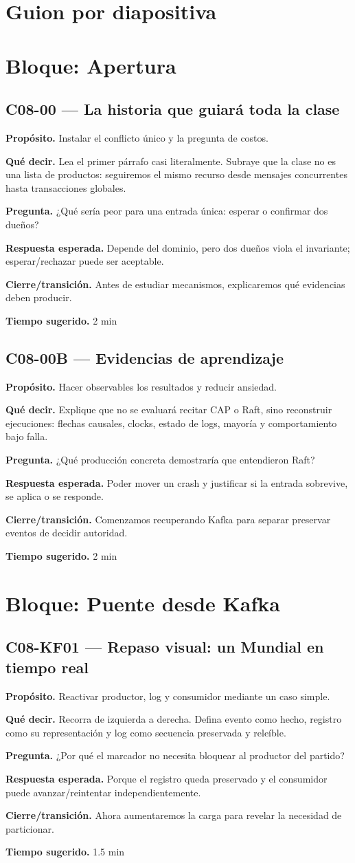 \documentclass[variant=docente,cover=institutional,mode=screen]{ua-engineering-v6-article}
\newcommand{\FrameField}[2]{\par\noindent\textbf{#1.} #2\par}
\begin{document}
\section{Guion por diapositiva}

\section{Bloque: Apertura}

\subsection*{C08-00 --- La historia que guiará toda la clase}
\FrameField{Propósito}{Instalar el conflicto único y la pregunta de costos.}
\FrameField{Qué decir}{Lea el primer párrafo casi literalmente. Subraye que la clase no es una lista de productos: seguiremos el mismo recurso desde mensajes concurrentes hasta transacciones globales.}
\FrameField{Pregunta}{¿Qué sería peor para una entrada única: esperar o confirmar dos dueños?}
\FrameField{Respuesta esperada}{Depende del dominio, pero dos dueños viola el invariante; esperar/rechazar puede ser aceptable.}
\FrameField{Cierre/transición}{Antes de estudiar mecanismos, explicaremos qué evidencias deben producir.}
\FrameField{Tiempo sugerido}{2 min}

\subsection*{C08-00B --- Evidencias de aprendizaje}
\FrameField{Propósito}{Hacer observables los resultados y reducir ansiedad.}
\FrameField{Qué decir}{Explique que no se evaluará recitar CAP o Raft, sino reconstruir ejecuciones: flechas causales, clocks, estado de logs, mayoría y comportamiento bajo falla.}
\FrameField{Pregunta}{¿Qué producción concreta demostraría que entendieron Raft?}
\FrameField{Respuesta esperada}{Poder mover un crash y justificar si la entrada sobrevive, se aplica o se responde.}
\FrameField{Cierre/transición}{Comenzamos recuperando Kafka para separar preservar eventos de decidir autoridad.}
\FrameField{Tiempo sugerido}{2 min}

\section{Bloque: Puente desde Kafka}

\subsection*{C08-KF01 --- Repaso visual: un Mundial en tiempo real}
\FrameField{Propósito}{Reactivar productor, log y consumidor mediante un caso simple.}
\FrameField{Qué decir}{Recorra de izquierda a derecha. Defina evento como hecho, registro como su representación y log como secuencia preservada y releíble.}
\FrameField{Pregunta}{¿Por qué el marcador no necesita bloquear al productor del partido?}
\FrameField{Respuesta esperada}{Porque el registro queda preservado y el consumidor puede avanzar/reintentar independientemente.}
\FrameField{Cierre/transición}{Ahora aumentaremos la carga para revelar la necesidad de particionar.}
\FrameField{Tiempo sugerido}{1.5 min}
\end{document}
